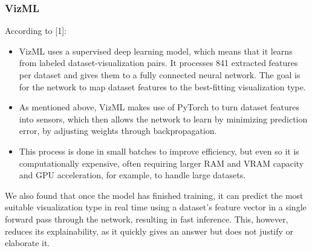 \subsubsection{VizML}
According to [1]:
\begin{itemize}
\item VizML uses a supervised deep learning model, which means that it learns from labeled dataset-visualization pairs.
It processes 841 extracted features per dataset and gives them to a fully connected neural network.
The goal is for the network to map dataset features to the best-fitting visualization type.

\item As mentioned above, VizML makes use of PyTorch to turn dataset features into sensors, which then allows the network to learn by minimizing prediction error, by adjusting weights through backpropagation.

\item This process is done in small batches to improve efficiency, but even so it is computationally expensive, often requiring larger RAM and VRAM capacity and GPU acceleration, for example, to handle large datasets.

\end{itemize}



We also found that once the model has finished training, it can predict the most suitable visualization type in real time using a dataset’s feature vector in a single forward pass through the network, resulting in fast inference.
This, however, reduces its explainability, as it quickly gives an answer but does not justify or elaborate it.


\newcommand{\lowtilde}{\raisebox{-0.5ex}{\textasciitilde}} %

